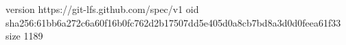 version https://git-lfs.github.com/spec/v1
oid sha256:61bb6a272c6a60f16b0fc762d2b17507dd5e405d0a8cb7bd8a3d0d0feea61f33
size 1189
